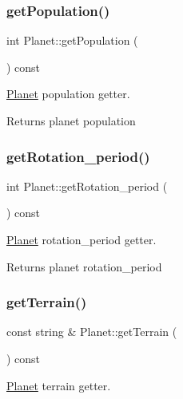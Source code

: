 \subsubsection{\texorpdfstring{get\+Population()}{getPopulation()}}
{\footnotesize\ttfamily int Planet\+::get\+Population (\begin{DoxyParamCaption}{ }\end{DoxyParamCaption}) const}



\hyperlink{class_planet}{Planet} population getter. 

\begin{DoxyReturn}{Returns}
planet population 
\end{DoxyReturn}
\mbox{\label{class_planet_a4f49642d968d2049185eef83c381d570}} 
\subsubsection{\texorpdfstring{get\+Rotation\+\_\+period()}{getRotation\_period()}}
{\footnotesize\ttfamily int Planet\+::get\+Rotation\+\_\+period (\begin{DoxyParamCaption}{ }\end{DoxyParamCaption}) const}



\hyperlink{class_planet}{Planet} rotation\+\_\+period getter. 

\begin{DoxyReturn}{Returns}
planet rotation\+\_\+period 
\end{DoxyReturn}
\mbox{\label{class_planet_a418c3e489845a9098397b8fb5613a5c1}} 
\subsubsection{\texorpdfstring{get\+Terrain()}{getTerrain()}}
{\footnotesize\ttfamily const string \& Planet\+::get\+Terrain (\begin{DoxyParamCaption}{ }\end{DoxyParamCaption}) const}



\hyperlink{class_planet}{Planet} terrain getter. 

